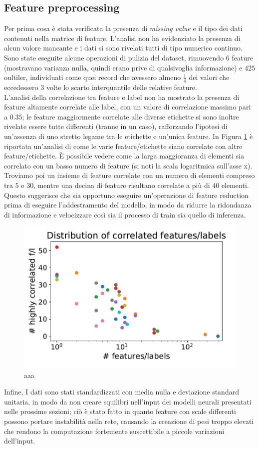 \subsection{Feature preprocessing}
Per prima cosa è stata verificata la presenza di \textit{missing value} e il tipo dei dati contenuti nella matrice di feature. L'analisi non ha evidenziato la presenza di alcun valore mancante e i dati si sono rivelati tutti di tipo numerico continuo.\\
Sono state eseguite alcune operazioni di pulizia del dataset, rimuovendo $6$ feature (mostravano varianza nulla, quindi erano prive di qualsivoglia informazione) e $425$ oultiler, individuati come quei record che avessero almeno $\frac{1}{4}$ dei valori che eccedessero $3$ volte lo scarto interquantile delle relative feature.\\
L'analisi della correlazione tra feature e label non ha mostrato la presenza di feature altamente correlate alle label, con un valore di correlazione massimo pari a $0.35$; le feature maggiormente correlate alle diverse etichette si sono inoltre rivelate essere tutte differenti (tranne in un caso), rafforzando l'ipotesi di un'assenza di uno stretto legame tra le etichette e un'unica feature.
In Figura \ref{fig:distributionhighcorr} è riportata un'analisi di come le varie feature/etichette siano correlate con altre feature/etichette. È possibile vedere come la larga maggioranza di elementi sia correlato con un basso numero di feature (si noti la scala logaritmica sull'asse x). Troviamo poi un insieme di feature correlate con un numero di elementi compreso tra $5$ e $30$, mentre una decina di feature risultano correlate a più di 40 elementi. Questo suggerisce che sia opportuno eseguire un'operazione di feature reduction prima di eseguire l'addestramento del modello, in modo da ridurre la ridondanza di informazione e velocizzare così sia il processo di train sia quello di inferenza.
\begin{figure}
	\centering
	\includegraphics[width=0.7\linewidth]{../images/pdf/distribution_high_corr}
	\caption{aaa}
	\label{fig:distributionhighcorr}
\end{figure}
Infine, I dati sono stati  standardizzati con media nulla e deviazione standard unitaria, in modo da non creare squilibri nell'input dei modelli neurali presentati nelle prossime sezioni; ciò è stato fatto in quanto feature con scale differenti possono portare instabilità nella rete, causando la creazione di pesi troppo elevati che rendono la computazione fortemente suscettibile a piccole variazioni dell'input.